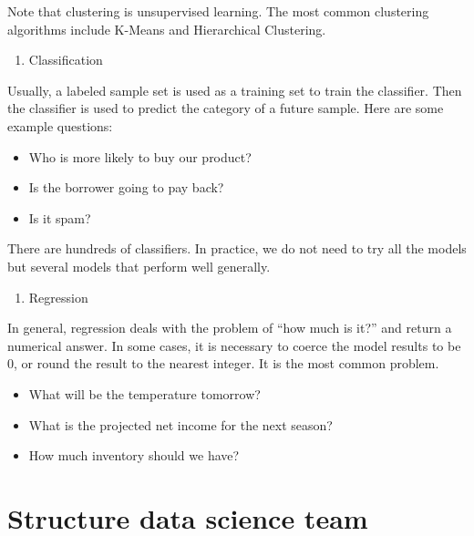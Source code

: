 \documentclass[12pt,]{krantz}
\providecommand{\tightlist}{%
  \setlength{\itemsep}{0pt}\setlength{\parskip}{0pt}}
\theoremstyle{definition}
\theoremstyle{definition}
\theoremstyle{definition}
\theoremstyle{remark}
\begin{document}
Note that clustering is unsupervised learning. The most common
clustering algorithms include K-Means and Hierarchical Clustering.

\begin{enumerate}
\def\labelenumi{\arabic{enumi}.}
\setcounter{enumi}{3}
\tightlist
\item
  Classification
\end{enumerate}

Usually, a labeled sample set is used as a training set to train the
classifier. Then the classifier is used to predict the category of a
future sample. Here are some example questions:

\begin{itemize}
\tightlist
\item
  Who is more likely to buy our product?
\item
  Is the borrower going to pay back?
\item
  Is it spam?
\end{itemize}

There are hundreds of classifiers. In practice, we do not need to try
all the models but several models that perform well generally.

\begin{enumerate}
\def\labelenumi{\arabic{enumi}.}
\setcounter{enumi}{4}
\tightlist
\item
  Regression
\end{enumerate}

In general, regression deals with the problem of ``how much is it?'' and
return a numerical answer. In some cases, it is necessary to coerce the
model results to be 0, or round the result to the nearest integer. It is
the most common problem.

\begin{itemize}
\tightlist
\item
  What will be the temperature tomorrow?
\item
  What is the projected net income for the next season?
\item
  How much inventory should we have?
\end{itemize}

\section{Structure data science team}\label{structure-data-science-team}
\end{document}

